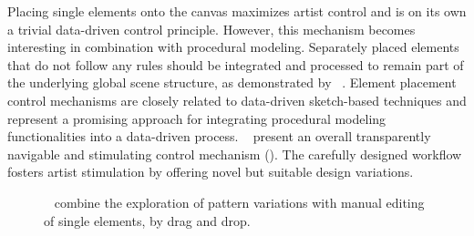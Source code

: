 Placing single elements onto the canvas maximizes artist control and is on its own a trivial data-driven control principle. However, this mechanism becomes interesting in combination with procedural modeling. Separately placed elements that do not follow any rules should be integrated and processed to remain part of the underlying global scene structure, as demonstrated by \citeauthor*{gieseke_2017_ooo}~\cite{gieseke_2017_ooo}.
Element placement control mechanisms are closely related to data-driven sketch-based techniques and represent a promising approach for integrating procedural modeling functionalities into a data-driven process. \citeauthor*{guerrero_2016_pep}~\cite{guerrero_2016_pep} present an overall transparently navigable and stimulating control mechanism (). The carefully designed workflow fosters artist stimulation by offering novel but suitable design variations.

\begin{figure}
    \centering
    \caption{\label{fig:guerrero_2016_pep}\citeauthor*{guerrero_2016_pep}~\cite{guerrero_2016_pep} combine the exploration of pattern variations with manual editing of single elements, \eg by drag and drop.}
\end{figure}